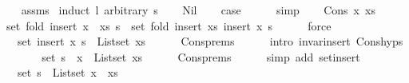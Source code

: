\begin{isabellebody}
%
\endisadeliminvisible
%
\isadelimproof
\ \ %
\endisadelimproof
%
\isatagproof
{}\isamarkupfalse%
\ assms\isanewline
{}\isamarkupfalse%
\ {\isacharparenleft}{\kern0pt}induct\ l\ arbitrary{\isacharcolon}{\kern0pt}\ s{\isacharparenright}{\kern0pt}\isanewline
\ \ \isamarkupfalse%
\ Nil\isanewline
\ \ \isamarkupfalse%
\ {\isacharquery}{\kern0pt}case\isanewline
\ \ \ \ \isamarkupfalse%
\ simp\isanewline
{}\isamarkupfalse%
\isanewline
\ \ \isamarkupfalse%
\ {\isacharparenleft}{\kern0pt}Cons\ x\ xs{\isacharparenright}{\kern0pt}\isanewline
\ \ \isamarkupfalse%
\ {\isachardoublequoteopen}set\ {\isacharparenleft}{\kern0pt}fold\ insert\ {\isacharparenleft}{\kern0pt}x\ {\isacharhash}{\kern0pt}\ xs{\isacharparenright}{\kern0pt}\ s{\isacharparenright}{\kern0pt}\ {\isacharequal}{\kern0pt}\ set\ {\isacharparenleft}{\kern0pt}fold\ insert\ xs\ {\isacharparenleft}{\kern0pt}insert\ x\ s{\isacharparenright}{\kern0pt}{\isacharparenright}{\kern0pt}{\isachardoublequoteclose}\isanewline
\ \ \ \ \isamarkupfalse%
\ force\isanewline
\ \ \isamarkupfalse%
\ \isamarkupfalse%
\ {\isachardoublequoteopen}{\isachardot}{\kern0pt}{\isachardot}{\kern0pt}{\isachardot}{\kern0pt}\ {\isacharequal}{\kern0pt}\ set\ {\isacharparenleft}{\kern0pt}insert\ x\ s{\isacharparenright}{\kern0pt}\ {\isasymunion}\ List{\isachardot}{\kern0pt}set\ xs{\isachardoublequoteclose}\isanewline
\ \ \ \ \isamarkupfalse%
\ Cons{\isachardot}{\kern0pt}prems\isanewline
\ \ \ \ \isamarkupfalse%
\ {\isacharparenleft}{\kern0pt}intro\ invar{\isacharunderscore}{\kern0pt}insert\ Cons{\isachardot}{\kern0pt}hyps{\isacharparenright}{\kern0pt}\isanewline
\ \ \isamarkupfalse%
\ \isamarkupfalse%
\ {\isachardoublequoteopen}{\isachardot}{\kern0pt}{\isachardot}{\kern0pt}{\isachardot}{\kern0pt}\ {\isacharequal}{\kern0pt}\ set\ s\ {\isasymunion}\ {\isacharbraceleft}{\kern0pt}x{\isacharbraceright}{\kern0pt}\ {\isasymunion}\ List{\isachardot}{\kern0pt}set\ xs{\isachardoublequoteclose}\isanewline
\ \ \ \ \isamarkupfalse%
\ Cons{\isachardot}{\kern0pt}prems\isanewline
\ \ \ \ \isamarkupfalse%
\ {\isacharparenleft}{\kern0pt}simp\ add{\isacharcolon}{\kern0pt}\ set{\isacharunderscore}{\kern0pt}insert{\isacharparenright}{\kern0pt}\isanewline
\ \ \isamarkupfalse%
\ \isamarkupfalse%
\ {\isachardoublequoteopen}{\isachardot}{\kern0pt}{\isachardot}{\kern0pt}{\isachardot}{\kern0pt}\ {\isacharequal}{\kern0pt}\ set\ s\ {\isasymunion}\ List{\isachardot}{\kern0pt}set\ {\isacharparenleft}{\kern0pt}x\ {\isacharhash}{\kern0pt}\ xs{\isacharparenright}{\kern0pt}{\isachardoublequoteclose}\isanewline

\end{isabellebody}
